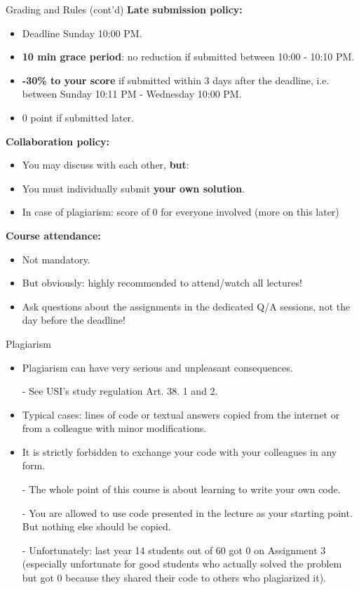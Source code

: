 \begin{frame}{Grading and Rules (cont'd)}
\textbf{Late submission policy:}
\begin{itemize}
\item Deadline Sunday 10:00 PM.
\item \textbf{10 min grace period}: no reduction if submitted between 10:00 - 10:10 PM.
\item \textbf{-30\% to your score} if submitted within 3 days after the deadline, i.e.\\
between Sunday 10:11 PM - Wednesday 10:00 PM.
\item 0 point if submitted later.
\end{itemize}
\vsp
\pause
\textbf{Collaboration policy:}
\begin{itemize}
\item You may discuss with each other, \textbf{but}:
\item You must individually submit \textbf{your own solution}.
\item In case of plagiarism: score of 0 for everyone involved (more on this later)
\end{itemize}
\pause
\vsp
\textbf{Course attendance:}
\begin{itemize}
\item Not mandatory.
\item But obviously: highly recommended to attend/watch all lectures!
\item Ask questions about the assignments in the dedicated Q/A sessions, not the day before the deadline!
\end{itemize}
\end{frame}

\begin{frame}{Plagiarism}
\begin{itemize}
\item Plagiarism can have very serious and unpleasant consequences.
\item[-] See USI's study regulation Art. 38. 1 and 2.\\ 
\vsp
\item Typical cases: lines of code or textual answers copied from the internet or from a colleague with minor modifications.
\item \alert{It is strictly forbidden to exchange your code with your colleagues in any form.}
\item[-] The whole point of this course is about learning to write your own code.
\item[-] You are allowed to use code presented in the lecture as your starting point. But nothing else should be copied.
\item[-] Unfortunately: last year 14 students out of 60 got 0 on Assignment 3 (especially unfortunate for good students who actually solved the problem but got 0 because they shared their code to others who plagiarized it).
\end{itemize}
\end{frame}

